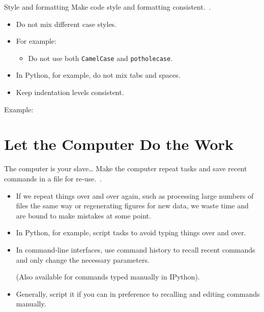 \documentclass[english]{beamer}
\newcommand{\sectionslide}{\centering\vspace*{25mm}%
  {\bfseries\LARGE \insertsection}}
\begin{document}

\begin{frame}[fragile]{\insertsection}{Style and formatting}
  Make code style and formatting consistent.~\cite{Wilson2013}.
  \begin{itemize}
  \item Do not mix different case styles.
  \item For example:
    \begin{itemize}
    \item Do not use both \texttt{CamelCase} and
      \texttt{pothole\textunderscore{}case}.
    \end{itemize}
  \item In Python, for example, do not mix tabs and spaces.
  \item Keep indentation levels consistent.
  \end{itemize}
  Example:
  
\end{frame}


\section{Let the Computer Do the Work}

\begin{frame}
  \sectionslide
\end{frame}


\begin{frame}{\insertsection}{The computer is your slave\ldots}
  Make the computer repeat tasks and save recent commands in a file
  for re-use.~\cite{Wilson2013}.
  \begin{itemize}
  \item If we repeat things over and over again, such as processing
    large numbers of files the same way or regenerating figures for
    new data, we waste time and are bound to make mistakes at some
    point.
  \item In Python, for example, script tasks to avoid typing things
    over and over.
  \item In command-line interfaces, use command history to recall
    recent commands and only change the necessary parameters.

    (Also available for commands typed manually in IPython).
  \item Generally, script it if you can in preference to recalling and
    editing commands manually.
  \end{itemize}
\end{frame}
\end{document}
